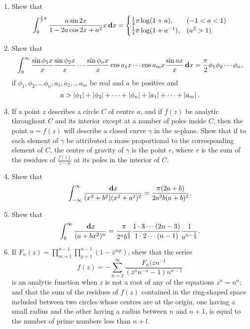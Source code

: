 \begin{enumerate}
\item
  Shew that
  $$
  \int_{0}^{\frac{1}{2}\pi}
  \frac{a \sin 2x}{1 - 2a \cos 2x + a^{2}}
  x \, \mathbf{d} x
  =
  \begin{cases}
    \frac{1}{4} \pi \log (1+a), & (-1<a<1)
    \\
    \frac{1}{4} \pi \log (1+a^{-1}), & (a^{2} > 1).
  \end{cases}
  $$
\item Shew that
  $$
  \int_{0}^{\infty}
  \frac{\sin \phi_{1}x}{x}
  \frac{\sin \phi_{2}x}{x}
  \cdots
  \frac{\sin \phi_{n}x}{x}
  \cos a_{1} x
  \cdots
  \cos a_{m} x
  \frac{ \sin ax }{x}
  \, \mathbf{d} x
  =
  \frac{\pi}{2} \phi_{1} \phi_{2} \cdots \phi_{n},
  $$
  if $\phi_{1}, \phi_{2}, \ldots \phi_{n}, a_{1}, a_{2}, \ldots a_{m}$
  be real and $a$ be positive and
  $$
  a
  >
  \left| \phi_{1} \right|
  + \left| \phi_{2} \right|
  + \cdots
  + \left| \phi_{n} \right|
  + \left| a_{1} \right|
  + \cdots
  + \left| a_{m} \right|.
  $$
\item
  If a point $z$ describes a circle $C$ of centre $a$, and if
  $f(z)$ be analytic throughout $C$ and its interior except at a
  number of poles inside $C$, then the point $u=f(z)$ will
  describe a closed curve $\gamma$ in the $u$-plane.
  Shew that if to each element of $\gamma$ be attributed
  a mass proportional to the corresponding element of $C$, the centre of
  gravity of $\gamma$ is the 
  point $r$, where $r$ is the sum of the residues of
  $\frac{f(z)}{z-a}$ at its poles in the interior of $C$.
\item  Shew that
  $$
  \int_{-\infty}^{\infty}
  \frac{\, \mathbf{d} x}{ (x^{2}+b^{2}) (x^{2}+a^{2})^{2} }
  =
  \frac{\pi (2a+b)}{ 2a^{3}b(a+b)^{2}}.
  $$
\item 
  Shew that
  $$
  \int_{0}^{\infty}
  \frac{\, \mathbf{d} x}{(a+bx^{2})^{n}}
  =
  \frac{\pi}{ 2^{n} b^{\frac{1}{2}} }
  \frac{1 \cdot 3 \cdots (2n-3)}{1 \cdot 2 \cdots (n-1)}
  \frac{1}{ a^{n-\frac{1}{2}} }.
  $$
%
%

\item 
  If $F_{n}(z)= \prod_{m=1}^{n-1} \prod_{p=1}^{n-1} (1-z^{mp})$, shew that the series
  $$
  f(z)
  =
  - \sum_{n=2}^{\infty}
  \frac{F_{n}(zn^{-1}}{ (z^{n}n^{-n} -1) n^{n-1} }
  $$
  is an analytic function when $z$ is not a root of any of the equations
  $z^{n} = n^{n}$; and that the sum of the residues of $f(z)$ contained in the
  ring-shaped space included between two circles whose centres are at
  the origin, one having a small radius and the other having a radius
  between $n$ and $n + 1$, is equal to the number of prime numbers less than
  $n + l$. 


\end{enumerate}
